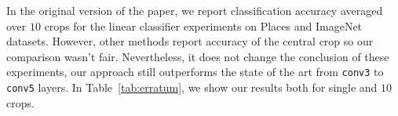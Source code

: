 In the original version of the paper, we report classification accuracy averaged over $10$ crops for the linear classifier experiments on Places and ImageNet datasets.
However, other methods report accuracy of the central crop so our comparison wasn't fair.
Nevertheless, it does not change the conclusion of these experiments, our approach still outperforms the state of the art from \texttt{conv3} to \texttt{conv5} layers.
In Table~\ref{tab:erratum}, we show our results both for single and $10$ crops.
\begin{table}[t]
  \centering
  \vspace{\soustable}
  \caption{
    Linear classification on ImageNet and Places using activations from the convolutional layers of an AlexNet as features.
  }
  \label{tab:erratum}
\end{table}
